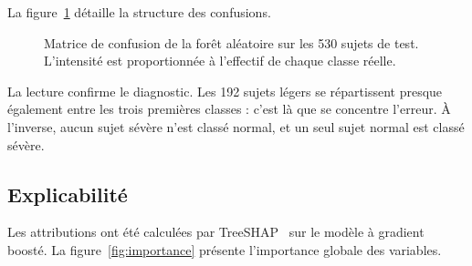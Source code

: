 La figure~\ref{fig:cm-osa} détaille la structure des confusions.

\begin{figure}[H]
\centering
{}
\vspace{0.3cm}
\caption[Matrice de confusion de la prédiction de sévérité]%
        {Matrice de confusion de la forêt aléatoire sur les 530 sujets de test.
         L'intensité est proportionnée à l'effectif de chaque classe réelle.}
\label{fig:cm-osa}
\end{figure}

La lecture confirme le diagnostic. Les \num{192} sujets légers se répartissent presque
également entre les trois premières classes : c'est là que se concentre l'erreur. À
l'inverse, aucun sujet sévère n'est classé normal, et un seul sujet normal est classé
sévère.

\subsection{Explicabilité}

Les attributions ont été calculées par TreeSHAP~\cite{lundberg2020} sur le modèle à
gradient boosté. La figure~\ref{fig:importance} présente l'importance globale des
variables.

